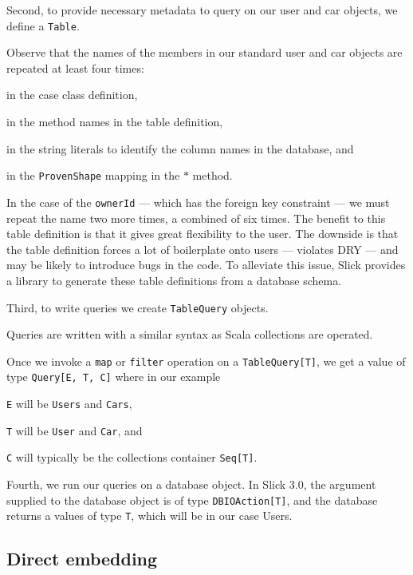 Second, to provide necessary metadata to query on our user and car objects, we define a \texttt{Table}.

Observe that the names of the members in our standard user and car objects are repeated at least four times: 
\begin{inparaenum}[i)]
    \item in the case class definition,
    \item in the method names in the table definition,
    \item in the string literals to identify the column names in the database, and
    \item in the \texttt{ProvenShape} mapping in the \texttt{$\ast$} method.
\end{inparaenum}
In the case of the \texttt{ownerId} --- which has the foreign key constraint --- we must repeat the name two more times, a combined of six times.
The benefit to this table definition is that it gives great flexibility to the user.
The downside is that the table definition forces a lot of boilerplate onto users --- violates DRY --- and may be likely to introduce bugs in the code.
To alleviate this issue, Slick provides a library to generate these table definitions from a database schema.

Third, to write queries we create \texttt{TableQuery} objects.

Queries are written with a similar syntax as Scala collections are operated.

Once we invoke a \texttt{map} or \texttt{filter} operation on a \texttt{TableQuery[T]}, we get a value of type \texttt{Query[E, T, C]} where in our example
\begin{inparaenum}[i)]
\item \texttt{E} will be \texttt{Users} and \texttt{Cars}, 
\item \texttt{T} will be \texttt{User} and \texttt{Car}, and
\item \texttt{C} will typically be the collections container \texttt{Seq[T]}.
\end{inparaenum}

Fourth, we run our queries on a database object.
In Slick 3.0, the argument supplied to the database object is of type \texttt{DBIOAction[T]}, and the database returns a values of type \texttt{T}, which will be in our case Users.

\subsection{Direct embedding} %
\label{sub:Directembedding}

